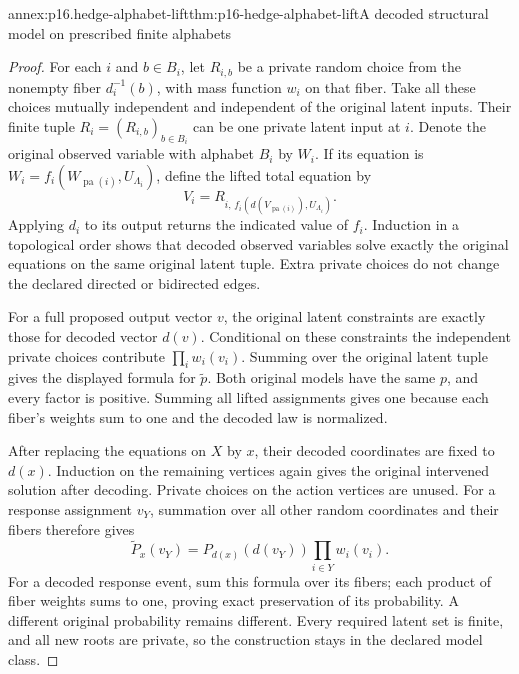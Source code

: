 \begin{annexitem}{annex:p16.hedge-alphabet-lift}{thm:p16-hedge-alphabet-lift}{A decoded structural model on prescribed finite alphabets}
\begin{proof}
For each \(i\) and \(b\in B_i\), let \(R_{i,b}\) be a
private random choice from the nonempty fiber \(d_i^{-1}(b)\),
with mass function \(w_i\) on that fiber. Take all these choices
mutually independent and independent of the original latent inputs.
Their finite tuple \(R_i=(R_{i,b})_{b\in B_i}\) can be one
private latent input at \(i\). Denote the original observed variable
with alphabet \(B_i\) by \(W_i\). If its equation is
\(W_i=f_i(W_{\operatorname{pa}(i)},U_{\Lambda_i})\), define
the lifted total equation by
\[
 V_i=R_{i,\,f_i(d(V_{\operatorname{pa}(i)}),U_{\Lambda_i})}.
\]
Applying \(d_i\) to its output returns the indicated value of
\(f_i\). Induction in a topological order shows that decoded
observed variables solve exactly the original equations on the same
original latent tuple. Extra private choices do not change the
declared directed or bidirected edges.

For a full proposed output vector \(v\), the original latent
constraints are exactly those for decoded vector \(d(v)\).
Conditional on these constraints the independent private choices
contribute \(\prod_i w_i(v_i)\). Summing over the original
latent tuple gives the displayed formula for \(\widetilde p\).
Both original models have the same \(p\), and every factor is
positive. Summing all lifted assignments gives one because each
fiber's weights sum to one and the decoded law is normalized.

After replacing the equations on \(X\) by \(x\), their decoded
coordinates are fixed to \(d(x)\). Induction on the remaining
vertices again gives the original intervened solution after decoding.
Private choices on the action vertices are unused. For a response
assignment \(v_Y\), summation over all other random coordinates
and their fibers therefore gives
\[
 \widetilde P_x(v_Y)
   =P_{d(x)}(d(v_Y))\prod_{i\in Y}w_i(v_i).
\]
For a decoded response event, sum this formula over its fibers;
each product of fiber weights sums to one, proving exact preservation
of its probability. A different original probability remains different.
Every required latent set is finite, and all new roots are private,
so the construction stays in the declared model class.
\end{proof}
\end{annexitem}

